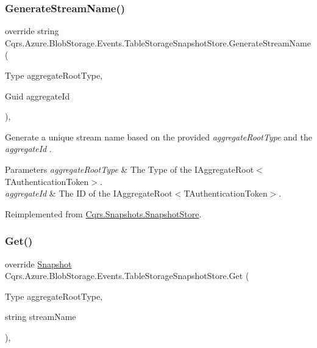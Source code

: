 \subsubsection{\texorpdfstring{Generate\+Stream\+Name()}{GenerateStreamName()}}
{\footnotesize\ttfamily override string Cqrs.\+Azure.\+Blob\+Storage.\+Events.\+Table\+Storage\+Snapshot\+Store.\+Generate\+Stream\+Name (\begin{DoxyParamCaption}\item[{Type}]{aggregate\+Root\+Type,  }\item[{Guid}]{aggregate\+Id }\end{DoxyParamCaption})\hspace{0.3cm}{\ttfamily [protected]}, {\ttfamily [virtual]}}



Generate a unique stream name based on the provided {\itshape aggregate\+Root\+Type}  and the {\itshape aggregate\+Id} . 


\begin{DoxyParams}{Parameters}
{\em aggregate\+Root\+Type} & The Type of the I\+Aggregate\+Root$<$\+T\+Authentication\+Token$>$.\\
\hline
{\em aggregate\+Id} & The ID of the I\+Aggregate\+Root$<$\+T\+Authentication\+Token$>$.\\
\hline
\end{DoxyParams}


Reimplemented from \hyperlink{classCqrs_1_1Snapshots_1_1SnapshotStore_a8ff909b77429c8a924376962bba36849_a8ff909b77429c8a924376962bba36849}{Cqrs.\+Snapshots.\+Snapshot\+Store}.

\mbox{\label{classCqrs_1_1Azure_1_1BlobStorage_1_1Events_1_1TableStorageSnapshotStore_a169361a7fbf413fed660609f66d95e13_a169361a7fbf413fed660609f66d95e13}} 
\subsubsection{\texorpdfstring{Get()}{Get()}}
{\footnotesize\ttfamily override \hyperlink{classCqrs_1_1Snapshots_1_1Snapshot}{Snapshot} Cqrs.\+Azure.\+Blob\+Storage.\+Events.\+Table\+Storage\+Snapshot\+Store.\+Get (\begin{DoxyParamCaption}\item[{Type}]{aggregate\+Root\+Type,  }\item[{string}]{stream\+Name }\end{DoxyParamCaption})\hspace{0.3cm}{\ttfamily [protected]}, {\ttfamily [virtual]}}



